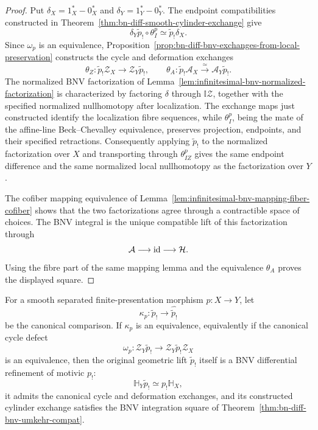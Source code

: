 \begin{proof}
Put \(\delta_X=1_X^*-0_X^*\) and \(\delta_Y=1_Y^*-0_Y^*\).  The endpoint
compatibilities constructed in
Theorem~\ref{thm:bn-diff-smooth-cylinder-exchange} give
\[
  \delta_Y\widetilde p_!\circ\theta_I^p
  \simeq
  \widetilde p_!\delta_X.
\]
Since \(\omega_p\) is an equivalence,
Proposition~\ref{prop:bn-diff-bnv-exchanges-from-local-preservation}
constructs the cycle and deformation exchanges
\[
  \theta_Z:
  \widetilde p_!\mathcal Z_X
  \longrightarrow
  \mathcal Z_Y\widetilde p_!,
  \qquad
  \theta_A:
  \widetilde p_!\mathcal A_X
  \xrightarrow{\simeq}
  \mathcal A_Y\widetilde p_!.
\]
The normalized BNV factorization of
Lemma~\ref{lem:infinitesimal-bnv-normalized-factorization} is characterized by
factoring \(\delta\) through \(\mathbb I\mathcal Z\), together with the
specified normalized nullhomotopy after localization.  The exchange maps just
constructed identify the localization fibre sequences, while
\(\theta_I^p\), being the mate of the affine-line Beck--Chevalley equivalence,
preserves projection, endpoints, and their specified retractions.
Consequently applying \(\widetilde p_!\) to the normalized factorization over
\(X\) and transporting through \(\theta_{IZ}^p\) gives the same endpoint
difference and the same normalized local nullhomotopy as the factorization
over \(Y\).

The cofiber mapping equivalence of
Lemma~\ref{lem:infinitesimal-bnv-mapping-fiber-cofiber} shows that the two
factorizations agree through a contractible space of choices.  The BNV
integral is the unique compatible lift of this factorization through
\[
  \mathcal A\longrightarrow\operatorname{id}\longrightarrow\mathcal H.
\]
Using the fibre part of the same mapping lemma and the equivalence
\(\theta_A\) proves the displayed square.
\end{proof}

\begin{corollary}
\label{cor:bn-diff-smooth-bnv-umkehr-obstruction}
For a smooth separated finite-presentation morphism \(p:X\to Y\), let
\[
  \kappa_p:
  \widetilde p_!
  \longrightarrow
  \widehat{\widetilde p_!}
\]
be the canonical comparison.  If \(\kappa_p\) is an equivalence, equivalently
if the canonical cycle defect
\[
  \omega_p:
  \mathcal Z_Y\widetilde p_!
  \longrightarrow
  \mathcal Z_Y\widetilde p_!\mathcal Z_X
\]
is an equivalence, then the original geometric lift \(\widetilde p_!\) itself
is a BNV differential refinement of motivic \(p_!\):
\[
  \mathbb H_Y\widetilde p_!\simeq p_!\mathbb H_X,
\]
it admits the canonical cycle and deformation exchanges, and its constructed
cylinder exchange satisfies the BNV integration square of
Theorem~\ref{thm:bn-diff-bnv-umkehr-compat}.
\end{corollary}

